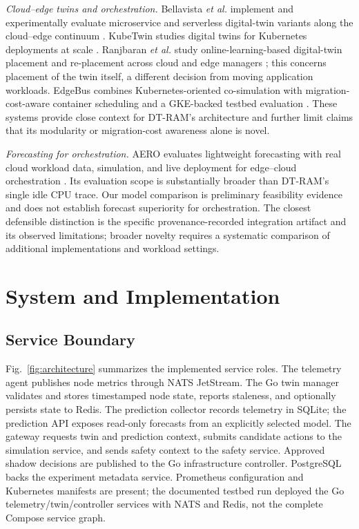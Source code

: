 \documentclass[conference]{IEEEtran}
\begin{document}
\textit{Cloud--edge twins and orchestration.} Bellavista \textit{et al.} implement and experimentally evaluate microservice and serverless digital-twin variants along the cloud--edge continuum \cite{bellavista2024}. KubeTwin studies digital twins for Kubernetes deployments at scale \cite{kubetwin2024}. Ranjbaran \textit{et al.} study online-learning-based digital-twin placement and re-placement across cloud and edge managers \cite{ranjbaran2024}; this concerns placement of the twin itself, a different decision from moving application workloads. EdgeBus combines Kubernetes-oriented co-simulation with migration-cost-aware container scheduling and a GKE-backed testbed evaluation \cite{edgebus2024}. These systems provide close context for DT-RAM's architecture and further limit claims that its modularity or migration-cost awareness alone is novel.

\textit{Forecasting for orchestration.} AERO evaluates lightweight forecasting with real cloud workload data, simulation, and live deployment for edge--cloud orchestration \cite{aero2025}. Its evaluation scope is substantially broader than DT-RAM's single idle CPU trace. Our model comparison is preliminary feasibility evidence and does not establish forecast superiority for orchestration. The closest defensible distinction is the specific provenance-recorded integration artifact and its observed limitations; broader novelty requires a systematic comparison of additional implementations and workload settings.

\section{System and Implementation}
\subsection{Service Boundary}
Fig.~\ref{fig:architecture} summarizes the implemented service roles. The telemetry agent publishes node metrics through NATS JetStream. The Go twin manager validates and stores timestamped node state, reports staleness, and optionally persists state to Redis. The prediction collector records telemetry in SQLite; the prediction API exposes read-only forecasts from an explicitly selected model. The gateway requests twin and prediction context, submits candidate actions to the simulation service, and sends safety context to the safety service. Approved shadow decisions are published to the Go infrastructure controller. PostgreSQL backs the experiment metadata service. Prometheus configuration and Kubernetes manifests are present; the documented testbed run deployed the Go telemetry/twin/controller services with NATS and Redis, not the complete Compose service graph.
\end{document}
